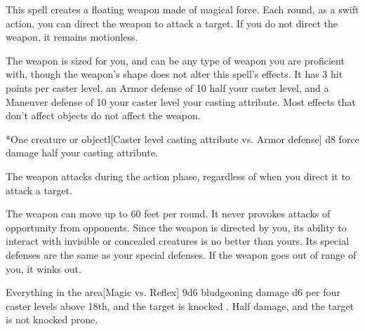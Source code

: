 \begin{spellheader}
    \spellrng{\rngmed}
    \spelldur{\durshort \dismissable}
\end{spellheader}
\begin{spelleffects}
    \spelleffect This spell creates a floating weapon made of magical force. Each round, as a swift action, you can direct the weapon to attack a target. If you do not direct the weapon, it remains motionless.

    The weapon is sized for you, and can be any type of weapon you are proficient with, though the weapon's shape does not alter this spell's effects. It has 3 hit points per caster level, an Armor defense of 10 \add half your caster level, and a Maneuver defense of 10 \add your caster level \add your casting attribute. Most effects that don't affect objects do not affect the weapon.

    \begin{spelltarget}*{One creature or object}l[Caster level \add casting attribute vs. Armor defense]
        \spellsuccess d8 force damage \add half your casting attribute.
    \end{spelltarget}
\end{spelleffects}
\begin{spellfooter}
    \spellnotes The weapon attacks during the action phase, regardless of when you direct it to attack a target.

    The weapon can move up to 60 feet per round. It never provokes attacks of opportunity from opponents. Since the weapon is directed by you, its ability to interact with invisible or concealed creatures is no better than yours. Its special defenses are the same as your special defenses. If the weapon goes out of range of you, it winks out.
\end{spellfooter}

\begin{spellheader}
    \spelldur{\durshort \dismissable}
\end{spellheader}
\begin{spelleffects}
    \begin{spelltarget}{Everything in the area}[Magic vs. Reflex]
        \spellsuccess 9d6 bludgeoning damage \add d6 per four caster levels above 18th, and the target is knocked \prone.
        \spellfailure Half damage, and the target is not knocked prone.
    \end{spelltarget}
\end{spelleffects}
\begin{spellfooter}
    
\end{spellfooter}

